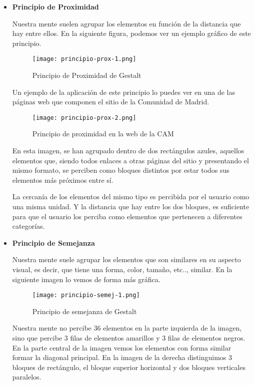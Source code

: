 \begin{itemize}
    \item \textbf{Principio de Proximidad}

    Nuestra mente suelen agrupar los elementos en función de la distancia que hay entre ellos. En la siguiente figura, podemos ver un ejemplo gráfico de este principio.

    \begin{figure}[H]
        \centering
        \texttt{[image: principio-prox-1.png]}
        \caption{Principio de Proximidad de Gestalt}
    \end{figure}

    Un ejemplo de la aplicación de este principio lo puedes ver en una de las páginas web que componen el sitio de la Comunidad de Madrid.

    \begin{figure}[H]
        \centering
        \texttt{[image: principio-prox-2.png]}
        \caption{Principio de proximidad en la web de la CAM}
    \end{figure}

     En esta imagen, se han agrupado dentro de dos rectángulos azules, aquellos elementos que, siendo todos enlaces a otras páginas del sitio y presentando el mismo formato, se perciben como bloques distintos por estar todos sus elementos más próximos entre sí.

     La cercanía de los elementos del mismo tipo es percibida por el usuario como una misma unidad. Y la distancia que hay entre los dos bloques, es suficiente para que el usuario los perciba como elementos que pertenecen a diferentes categorías.

     \item \textbf{Principio de Semejanza}

     Nuestra mente suele agrupar los elementos que son similares en su aspecto visual, es decir, que tiene una forma, color, tamaño, etc.., similar. En la siguiente imagen lo vemos de forma más gráfica.

     \begin{figure}[H]
         \centering
         \texttt{[image: principio-semej-1.png]}
         \caption{Principio de semejanza de Gestalt}
     \end{figure}

    Nuestra mente no percibe 36 elementos en la parte izquierda de la imagen, sino que percibe 3 filas de elementos amarillos y 3 filas de elementos negros. En la parte central de la imagen vemos los elementos con forma similar formar la diagonal principal. En la imagen de la derecha distinguimos 3 bloques de rectángulo, el bloque superior horizontal y dos bloques verticales paralelos.


\end{itemize}
